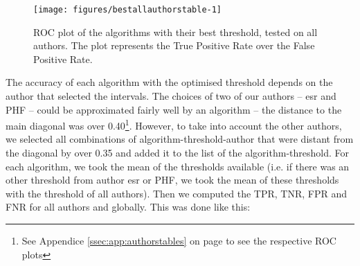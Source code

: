 \documentclass{article}\usepackage[]{graphicx}\usepackage[]{color}
\begin{document}
\begin{Schunk}
\begin{figure}
\texttt{[image: figures/bestallauthorstable-1]} \caption[ROC plot of the algorithms with their best threshold, tested on all authors]{ROC plot of the algorithms with their best threshold, tested on all authors. The plot represents the True Positive Rate over the False Positive Rate.}\label{fig:bestallauthorstable}
\end{figure}
\end{Schunk}

The accuracy of each algorithm with the optimised threshold depends on the author that selected the intervals. The choices of two of our authors -- esr and PHF -- could be approximated fairly well by an algorithm -- the distance to the main diagonal was over 0.40\footnote{See Appendice \ref{ssec:app:authorstables} on page \pageref{ssec:app:authorstables} to see the respective ROC plots}. However, to take into account the other authors, we selected all combinations of algorithm-threshold-author that were distant from the diagonal by over 0.35 and added it to the list of the algorithm-threshold. For each algorithm, we took the mean of the thresholds available (i.e. if there was an other threshold from author esr or PHF, we took the mean of these thresholds with the threshold of all authors). Then we computed the TPR, TNR, FPR and FNR for all authors and globally. This was done like this:
\end{document}
